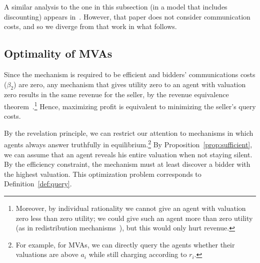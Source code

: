 A similar analysis to the one in this subsection (in a model that
includes discounting) appears in~\cite{McAfee97:SequentialAuctions}.  
However, that paper does not consider communication costs, and so we
diverge from that work in what follows.

\subsection{Optimality of MVAs}


Since the mechanism is required to be efficient and bidders' communications
costs ($\beta_2$) are zero, any mechanism that gives utility zero to an
agent with valuation zero results in the same revenue for the seller, by
the revenue equivalence theorem~\cite{Myerson:1981}.\footnote{Moreover, by
  individual rationality we cannot give an agent with valuation zero less
  than zero utility; we could give such an agent more than zero utility (as
  in redistribution mechanisms~\cite{}), but this would only hurt revenue.}
Hence, maximizing profit is equivalent to minimizing the seller's query
costs.

By the revelation principle, we can restrict our attention to mechanisms in
which agents always answer truthfully in equilibrium.\footnote{For
  example, for MVAs, we can directly query the agents whether their
  valuations are above $a_i$ while still charging according to 
  $r_i$.}  By Proposition~\ref{prop:sufficient}, we can assume that an
agent reveals his entire valuation when not staying silent.  By the
efficiency constraint, the mechanism must at least discover a bidder with
the highest valuation.  This optimization problem corresponds to
Definition~\ref{def:query}. 


